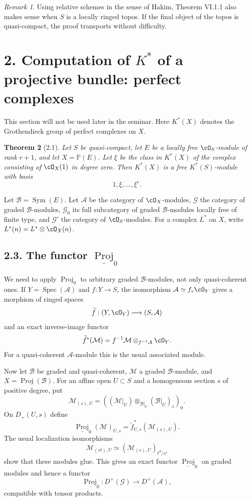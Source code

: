 \documentclass[11pt]{article}
\theoremstyle{plain}
\newtheorem{theorem}{Theorem}[section]
\theoremstyle{definition}
\theoremstyle{remark}
\newtheorem{remark}[theorem]{Remark}
\DeclareMathOperator{\Spec}{Spec}
\DeclareMathOperator{\Proj}{Proj}
\providecommand{\Sym}{\operatorname{Sym}}
\begin{document}
\begin{remark}
Using relative schemes in the sense of Hakim, Theorem VI.1.1 also makes sense when $S$ is a locally ringed topos. If the final object of the topos is quasi-compact, the proof transports without difficulty.
\end{remark}

\section*{2. Computation of $K^*$ of a projective bundle: perfect complexes}

This section will not be used later in the seminar. Here $K^*(X)$ denotes the Grothendieck group of perfect complexes on $X$.

\begin{theorem}[2.1]\label{thm:VI.2.1}
Let $S$ be quasi-compact, let $E$ be a locally free $\cO_S$-module of rank $r+1$, and let $X=\mathbb P(E)$. Let $\xi$ be the class in $K^*(X)$ of the complex consisting of $\cO_X(1)$ in degree zero. Then $K^*(X)$ is a free $K^*(S)$-module with basis
\[
1,\xi,\ldots,\xi^r.
\]
\end{theorem}

Let $\mathcal B=\Sym(E)$. Let $\mathcal A$ be the category of $\cO_X$-modules, $\mathcal G$ the category of graded $\mathcal B$-modules, $\mathcal G_0$ its full subcategory of graded $\mathcal B$-modules locally free of finite type, and $\mathcal G'$ the category of $\cO_S$-modules. For a complex $L^*$ on $X$, write $L^*(n)=L^*\otimes\cO_X(n)$.

\subsection*{2.3. The functor $\underline{\Proj}_0$}
We need to apply $\Proj_0$ to arbitrary graded $\mathcal B$-modules, not only quasi-coherent ones. If $Y=\Spec(\mathcal A)$ and $f:Y\to S$, the isomorphism $\mathcal A\simeq f_*\cO_Y$ gives a morphism of ringed spaces
\[
\widetilde f:(Y,\cO_Y)\longrightarrow(S,\mathcal A)
\]
and an exact inverse-image functor
\[
\widetilde f^*(\mathcal M)=f^{-1}\mathcal M\otimes_{f^{-1}\mathcal A}\cO_Y.
\]
For a quasi-coherent $\mathcal A$-module this is the usual associated module.

Now let $\mathcal B$ be graded and quasi-coherent, $\mathcal M$ a graded $\mathcal B$-module, and $X=\Proj(\mathcal B)$. For an affine open $U\subset S$ and a homogeneous section $s$ of positive degree, put
\[
\mathcal M_{(s),U}=((\mathcal M|_U)\otimes_{\mathcal B|_U}(\mathcal B|_U)_s)_0.
\]
On $D_+(U,s)$ define
\[
\underline{\Proj}_0(\mathcal M)_{U,s}=\widetilde f_{U,s}^{*}(\mathcal M_{(s),U}).
\]
The usual localization isomorphisms
\[
\mathcal M_{(st),U}\simeq (\mathcal M_{(s),U})_{t^d/s^e}
\]
show that these modules glue. This gives an exact functor $\underline{\Proj}_0$ on graded modules and hence a functor
\[
\underline{\Proj}_0:D^+(\mathcal G)\longrightarrow D^+(\mathcal A),
\]
compatible with tensor products.
\end{document}
